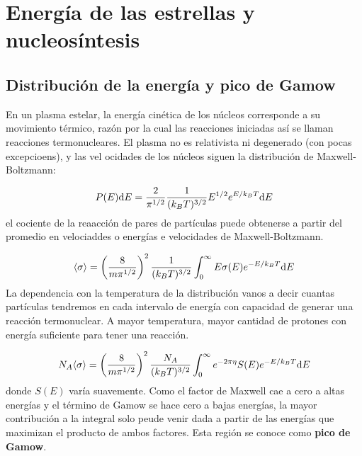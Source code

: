 
\section{Energía de las estrellas y nucleosíntesis}

\subsection{Distribución de la energía y pico de Gamow}

En un plasma estelar, la energía cinética de los núcleos corresponde a su movimiento térmico, razón por la cual las reacciones iniciadas así se llaman reacciones termonucleares. El plasma no es relativista ni degenerado (con pocas excepcioens), y las vel ocidades de los núcleos siguen la distribución de Maxwell-Boltzmann:

\begin{equation}
    P(E) \mathrm{d} E = \frac{2}{\pi^{1/2}}  \frac{1}{(k_BT)^{3/2}} E^{1/2} e^{E/k_BT}\mathrm{d} E
\end{equation}
el cociente de la reaacción de pares de partículas puede obtenerse a partir del promedio en velociaddes o energías e velocidades de Maxwell-Boltzmann. 

\begin{equation}
    \langle \sigma \rangle = \left( \frac{8}{m\pi^{1/2}} \right)^2 \frac{1}{(k_BT)^{3/2}} \int_{0}^{\infty} E \sigma (E) e^{-E/k_BT} \mathrm{d} E
\end{equation}
La dependencia con la temperatura de la distribución vanos a decir cuantas partículas tendremos en cada intervalo de energía con capacidad de generar una reacción termonuclear. A mayor temperatura, mayor cantidad de protones con energía suficiente para tener una reacción. 

\begin{equation}
    N_A \langle \sigma \rangle = \left( \frac{8}{m\pi^{1/2}} \right)^2 \frac{N_A}{(k_BT)^{3/2}} \int_{0}^{\infty} e^{-2\pi  \eta} S(E) e^{-E/k_BT} \mathrm{d} E
\end{equation}
donde $S(E)$ varía suavemente. Como el factor de Maxwell cae a cero a altas energías y el término de Gamow se hace cero a bajas energías, la mayor contribución a la integral solo peude venir dada a partir de las energías que maximizan el producto de ambos factores. Esta región se conoce como \textbf{pico de Gamow}. 

